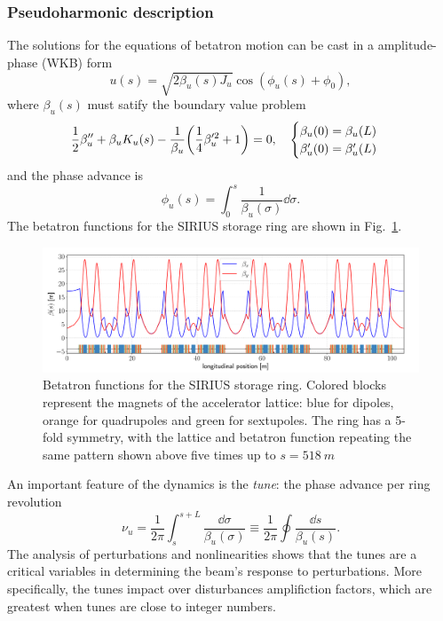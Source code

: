 \subsubsection{Pseudoharmonic description}
The solutions for the equations of betatron motion can be cast in a amplitude-phase (WKB) form
\begin{equation}
    u(s) = \sqrt{2\beta_u(s) J_u}\cos(\phi_u(s) + \phi_0),
\end{equation}
where $\beta_u(s)$ must satify the boundary value problem
\begin{equation}
    \frac{1}{2}\beta_{u}^{\prime\prime}+\beta_{u} K_u(s) - \frac{1}{\beta_{u}}\qty(\frac{1}{4}\beta_{u}^{\prime 2} + 1 ) = 0, \quad
        \begin{cases}
            \beta_{u}(0) = \beta_{u}(L)\\ \beta_{u}^{\prime}(0) = \beta_{u}^{\prime}(L)
        \end{cases}
\end{equation}
and the phase advance is
    \begin{equation}
        \phi_u(s) = \int_{0}^{s}\frac{1}{\beta_u(\sigma)}\dd\sigma.
   \end{equation}
The betatron functions for the SIRIUS storage ring are shown in Fig.~\ref{betafunc}.
\begin{figure}[htb]
    \centering
    \includegraphics[width=\textwidth]{Images/beta_functions.pdf}
    \caption{Betatron functions for the SIRIUS storage ring. Colored blocks represent the magnets of the accelerator lattice: blue for dipoles, orange for quadrupoles and green for sextupoles. The ring has a 5-fold symmetry, with the lattice and betatron function repeating the same pattern shown above five times up to $s=518~\unit{m}$}
    \label{betafunc}
\end{figure}

An important feature of the dynamics is the \textit{tune}: the phase advance per ring revolution
\begin{equation*}
    \nu_u=\frac{1}{2\pi}\int_{s}^{s+L}\frac{\dd \sigma}{\beta_u(\sigma)}\equiv\frac{1}{2\pi}\oint\frac{\dd s}{\beta_u(s)}.
\end{equation*}
The analysis of perturbations and nonlinearities shows that the tunes are a critical variables in determining the beam's response to perturbations. More specifically, the tunes impact over disturbances amplifiction factors, which are greatest when tunes are close to integer numbers.

